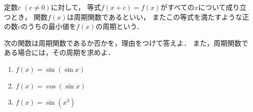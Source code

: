 \documentclass[../../main.tex]{subfiles}
\begin{document}
定数$c$ $(c\neq0)$に対して，
等式$f(x+c)=f(x)$がすべての$x$について成り立つとき，
関数$f(x)$は周期関数であるといい，
またこの等式を満たすような正の数$c$のうちの最小値を$f(x)$の周期という．

次の関数は周期関数であるか否かを，理由をつけて答えよ．
また，周期関数である場合には，その周期を求めよ．
\begin{enumerate}
  \item $f(x)=\sin(\sin x)$
  \item $f(x)=\cos(\sin x)$
  \item $f(x)=\sin(x^3)$
\end{enumerate}
\end{document}
